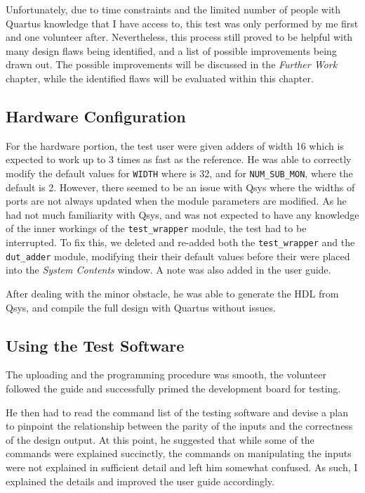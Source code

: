 Unfortunately, due to time constraints and the limited number of people with Quartus knowledge that I have access to, this test was only performed by me first and one volunteer after.
Nevertheless, this process still proved to be helpful with many design flaws being identified, and a list of possible improvements being drawn out.
The possible improvements will be discussed in the \textit{Further Work} chapter, while the identified flaws will be evaluated within this chapter.

\subsection{Hardware Configuration}
For the hardware portion, the test user were given adders of width 16 which is expected to work up to 3 times as fast as the reference.
He was able to correctly modify the default values for \texttt{WIDTH} where is 32, and for \texttt{NUM\_SUB\_MON}, where the default is 2.
However, there seemed to be an issue with Qsys where the widths of ports are not always updated when the module parameters are modified.
As he had not much familiarity with Qsys, and was not expected to have any knowledge of the inner workings of the \texttt{test\_wrapper} module, the test had to be interrupted.
To fix this, we deleted and re-added both the \texttt{test\_wrapper} and the \texttt{dut\_adder} module, modifying their their default values before their were placed into the \textit{System Contents} window.
A note was also added in the user guide.

After dealing with the minor obstacle, he was able to generate the HDL from Qsys, and compile the full design with Quartus without issues.

\subsection{Using the Test Software}
The uploading and the programming procedure was smooth, the volunteer followed the guide and successfully primed the development board for testing.

He then had to read the command list of the testing software and devise a plan to pinpoint the relationship between the parity of the inputs and the correctness of the design output.
At this point, he suggested that while some of the commands were explained succinctly, the commands on manipulating the inputs were not explained in sufficient detail and left him somewhat confused.
As such, I explained the details and improved the user guide accordingly.

